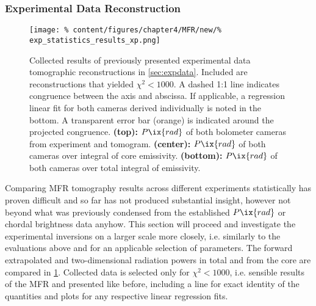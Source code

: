             \subsubsection*{Experimental Data Reconstruction}%
%
                \begin{figure}[t]%
                    \centering%
                    \captionsetup{width=.47\textwidth}%
                    \begin{minipage}[c]{0.47\textwidth}%
                        \centering%
                        \texttt{[image: \%
                            content/figures/chapter4/MFR/new/\%
                            exp\_statistics\_results\_xp.png]}%
                    \end{minipage}%
                    \hfill%
                    \begin{minipage}[c]{0.47\textwidth}%
                        \centering%
                        \caption{%
                            Collected results of previously presented experimental data tomographic reconstructions in \cref{sec:expdata}. Included are reconstructions that yielded $\chi^{2}<1000$. A dashed 1:1 line indicates congruence between the axis and abscissa. If applicable, a regression linear fit for both cameras derived individually is noted in the bottom. A transparent error bar (orange) is indicated around the projected congruence. \textbf{(top):} $P\ix{rad}$ of both bolometer cameras from experiment and tomogram. \textbf{(center):} $P\ix{rad}$ of both cameras over integral of core emissivity. \textbf{(bottom):} $P\ix{rad}$ of both cameras over total integral of emissivity.
                            }\label{fig:tomo_experiment_statistics}%
                    \end{minipage}%
                \end{figure}%
%
                Comparing MFR tomography results across different experiments statistically has proven difficult and so far has not produced substantial insight, however not beyond what was previously condensed from the established $P\ix{rad}$ or chordal brightness data anyhow. This section will proceed and investigate the experimental inversions on a larger scale more closely, i.e. similarly to the evaluations above and for an applicable selection of parameters. The forward extrapolated and two-dimensional radiation powers in total and from the core are compared in \cref{fig:tomo_experiment_statistics}. Collected data is selected only for $\chi^{2}<1000$, i.e. sensible results of the MFR and presented like before, including a line for exact identity of the quantities and plots for any respective linear regression fits.\\%
